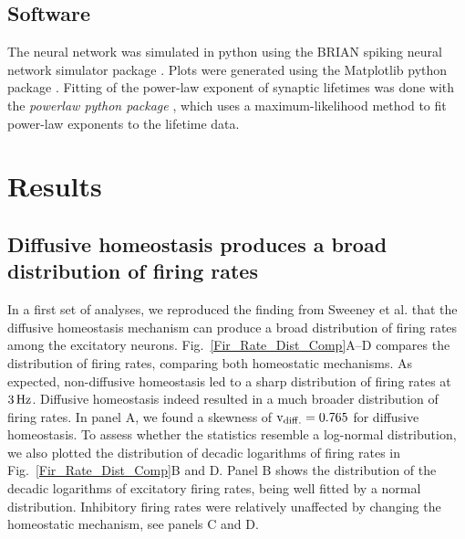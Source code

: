 \documentclass[10pt,letterpaper]{article}
\begin{document}
\subsection*{Software}
The neural network was simulated in python using the BRIAN spiking neural network simulator package \cite{Briansim}. Plots were generated using the Matplotlib python package \cite{Matplotlib}. Fitting of the power-law exponent of synaptic lifetimes was done with the \textit{powerlaw python package} \cite{Powerlaw_Package}, which uses a maximum-likelihood method to fit power-law exponents to the lifetime data.

\section*{Results}
\subsection*{Diffusive homeostasis produces a broad distribution of firing rates}\label{Fir_Dist_Section}
In a first set of analyses, we reproduced the finding from Sweeney et al. \cite{Sweeney_Paper} that the diffusive homeostasis mechanism can produce a broad distribution of firing rates among the excitatory neurons. Fig.~\ref{Fir_Rate_Dist_Comp}A--D compares the distribution of firing rates, comparing both homeostatic mechanisms. As expected, non-diffusive homeostasis led to a sharp distribution of firing rates at $\rm 3\, Hz$. Diffusive homeostasis indeed resulted in a much broader distribution of firing rates. In panel A, we found a skewness of $\mathrm{v_{\rm diff.} = 0.765}$ for diffusive homeostasis. To assess whether the statistics resemble a log-normal distribution, we also plotted the distribution of decadic logarithms of firing rates in Fig.~\ref{Fir_Rate_Dist_Comp}B and D. Panel B shows the distribution of the decadic logarithms of excitatory firing rates, being well fitted by a normal distribution. Inhibitory firing rates were relatively unaffected by changing the homeostatic mechanism, see panels C and D.  
\end{document}
